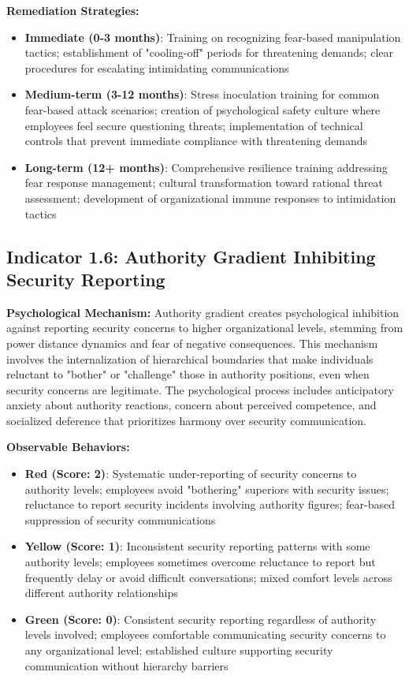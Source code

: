 \documentclass[11pt,a4paper]{article}
\begin{document}
\textbf{Remediation Strategies:}
\begin{itemize}
\item \textbf{Immediate (0-3 months)}: Training on recognizing fear-based manipulation tactics; establishment of "cooling-off" periods for threatening demands; clear procedures for escalating intimidating communications
\item \textbf{Medium-term (3-12 months)}: Stress inoculation training for common fear-based attack scenarios; creation of psychological safety culture where employees feel secure questioning threats; implementation of technical controls that prevent immediate compliance with threatening demands
\item \textbf{Long-term (12+ months)}: Comprehensive resilience training addressing fear response management; cultural transformation toward rational threat assessment; development of organizational immune responses to intimidation tactics
\end{itemize}

\subsection{Indicator 1.6: Authority Gradient Inhibiting Security Reporting}

\textbf{Psychological Mechanism:}
Authority gradient creates psychological inhibition against reporting security concerns to higher organizational levels, stemming from power distance dynamics and fear of negative consequences. This mechanism involves the internalization of hierarchical boundaries that make individuals reluctant to "bother" or "challenge" those in authority positions, even when security concerns are legitimate. The psychological process includes anticipatory anxiety about authority reactions, concern about perceived competence, and socialized deference that prioritizes harmony over security communication.

\textbf{Observable Behaviors:}
\begin{itemize}
\item \textbf{Red (Score: 2)}: Systematic under-reporting of security concerns to authority levels; employees avoid "bothering" superiors with security issues; reluctance to report security incidents involving authority figures; fear-based suppression of security communications
\item \textbf{Yellow (Score: 1)}: Inconsistent security reporting patterns with some authority levels; employees sometimes overcome reluctance to report but frequently delay or avoid difficult conversations; mixed comfort levels across different authority relationships
\item \textbf{Green (Score: 0)}: Consistent security reporting regardless of authority levels involved; employees comfortable communicating security concerns to any organizational level; established culture supporting security communication without hierarchy barriers
\end{itemize}
\end{document}
